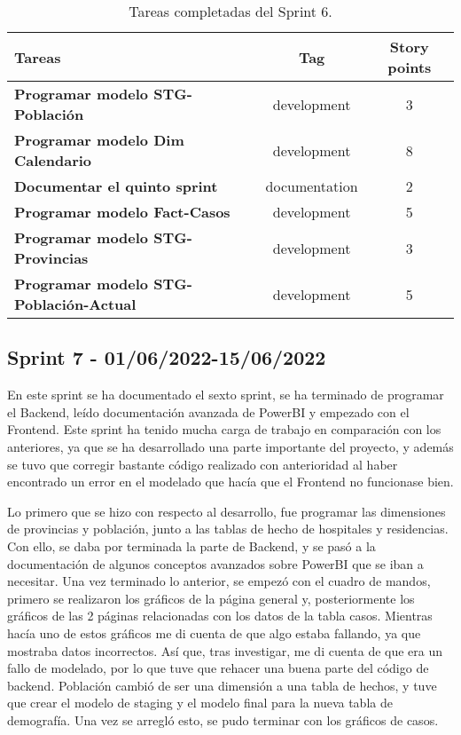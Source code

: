 \begin{table}[ht!]
    \centering
    \resizebox{15cm}{!} {
    \begin{tabular}{|l|c|c|}
    \hline
    \textbf{Tareas}     &\textbf{Tag}     & \textbf{Story points} \\ \hline
    \textbf{Programar modelo STG-Población}         &development      &3 \\ \hline 
    \textbf{Programar modelo Dim Calendario}         &development      &8 \\ \hline
    \textbf{Documentar el quinto sprint}         &documentation      &2 \\ \hline 
    \textbf{Programar modelo Fact-Casos}         &development      &5 \\ \hline 
    \textbf{Programar modelo STG-Provincias}         &development      &3 \\ \hline 
    \textbf{Programar modelo STG-Población-Actual}         &development      &5 \\ \hline
\end{tabular}}
    \caption{Tareas completadas del Sprint 6.}
    \label{tab:my_label}
\end{table}
\newpage
\subsection{Sprint 7 - 01/06/2022-15/06/2022}
En este sprint se ha documentado el sexto sprint, se ha terminado de programar el Backend, leído documentación avanzada de PowerBI y empezado con el Frontend. Este sprint ha tenido mucha carga de trabajo en comparación con los anteriores, ya que se ha desarrollado una parte importante del proyecto, y además se tuvo que corregir bastante código realizado con anterioridad al haber encontrado un error en el modelado que hacía que el Frontend no funcionase bien.

Lo primero que se hizo con respecto al desarrollo, fue programar las dimensiones de provincias y población, junto a las tablas de hecho de hospitales y residencias. Con ello, se daba por terminada la parte de Backend, y se pasó a la documentación de algunos conceptos avanzados sobre PowerBI que se iban a necesitar. Una vez terminado lo anterior, se empezó con el cuadro de mandos, primero se realizaron los gráficos de la página general y, posteriormente los gráficos de las 2 páginas relacionadas con los datos de la tabla casos. Mientras hacía uno de estos gráficos me di cuenta de que algo estaba fallando, ya que mostraba datos incorrectos. Así que, tras investigar, me di cuenta de que era un fallo de modelado, por lo que tuve que rehacer una buena parte del código de backend. Población cambió de ser una dimensión a una tabla de hechos, y tuve que crear el modelo de staging y el modelo final para la nueva tabla de demografía. Una vez se arregló esto, se pudo terminar con los gráficos de casos.


